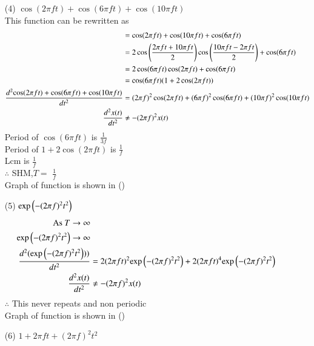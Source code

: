 \documentclass[journal,12pt,onecolumn]{IEEEtran}
\theoremstyle{remark}
\begin{document}
\begin{enumerate}
 \item[(4)]  $\cos(2\pi f t)+\cos(6\pi  f t)+\cos(10\pi  f t)$\\

This function can be rewritten as\\ 
 \begin{align}
  &=\cos(2\pi f t)+\cos(10\pi  f t)+\cos(6\pi  f t)\\
  &=2\cos\left(\frac{2\pi f t+10\pi f t}{2}\right)\cos\left(\frac{10\pi  f t-2\pi f t}{2}\right) +\cos(6\pi f t)\\
  &=2\cos(6\pi  f t) \cos(2\pi f t)+\cos(6\pi  f t)\\
  &=\cos(6\pi  f t) (1+2\cos(2\pi f t))\\
     \frac{d^2{\cos(2\pi f t)+\cos(6\pi  f t)+\cos(10\pi  f t)}}{dt^2}&=(2\pi f)^2\cos(2\pi f t)+(6\pi f)^2\cos(6\pi  f t)+(10\pi f)^2\cos(10\pi  f t)\\
      \frac{d^2 x(t)}{dt^2} &\neq - (2\pi f)^2 x(t)
 \end{align}
 Period of $\cos(6\pi  f t)$ is $\frac{1}{3f}$\\ 
 Period of $1+2\cos(2\pi f t)$ is $\frac{1}{f}$\\ 
 Lcm is $\frac{1}{f}$\\
 $\therefore$  SHM,$T=$ $\frac{1}{f}$\\
 Graph of function is shown in ()
 \\

 \item[(5)]  $\text{exp}\left(-(2\pi f)^2 t^2\right)$\\

       \begin{align}
     \text{As } T\to\infty\\
    \text{exp}\left(-(2\pi f)^2 t^2\right)\to \infty\\ 
    \frac{d^2(\text{exp}\left(-(2\pi f)^2 t^2\right)))}{dt^2}&=2(2\pi ft)^2\text{exp}\left(-(2\pi f)^2 t^2\right)+2(2\pi ft)^4\text{exp}\left(-(2\pi f)^2 t^2\right)\\
    \frac{d^2 x(t)}{dt^2} &\neq - (2\pi f)^2 x(t)
       \end{align}
    $\therefore$  This never repeats and non periodic\\
    Graph of function is shown in ()
    \\
    
 \item[(6)] $1+2\pi f t+(2\pi f)^2t^2$\\


\end{enumerate}
\end{document}
